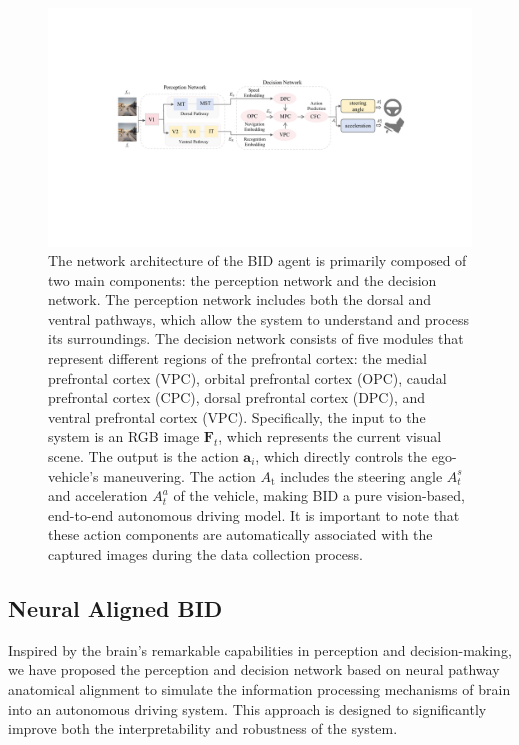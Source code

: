 \begin{figure}[t]
	\centering
	\includegraphics[width=\linewidth]{fig/net.pdf}
	\caption{The network architecture of the BID agent is primarily composed of two main components: the perception network and the decision network.
	The perception network includes both the dorsal and ventral pathways, which allow the system to understand and process its surroundings.
	The decision network consists of five modules that represent different regions of the prefrontal cortex: the medial prefrontal cortex (VPC), orbital prefrontal cortex (OPC), caudal prefrontal cortex (CPC), dorsal prefrontal cortex (DPC), and ventral prefrontal cortex (VPC). 
	Specifically, the input to the system is an RGB image $ \mathbf{F}_{t} $, which represents the current visual scene.
	The output is the action $\mathbf{a}_{i}$, which directly controls the ego-vehicle's maneuvering.
	The action $A_\text{t}$ includes the steering angle $ A_t^s $ and acceleration $ A_t^a $ of the vehicle, making BID a pure vision-based, end-to-end autonomous driving model.
	It is important to note that these action components are automatically associated with the captured images during the data collection process.
	}
	\label{fig:fig2}
\end{figure}


\subsection{Neural Aligned BID}
\hspace{1pc}Inspired by the brain's remarkable capabilities in perception and decision-making, we have proposed the perception and decision network based on neural pathway anatomical alignment to simulate the information processing mechanisms of brain into an autonomous driving system. 
This approach is designed to significantly improve both the interpretability and robustness of the system.

